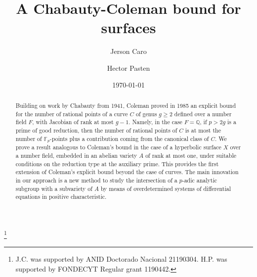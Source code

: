 \documentclass[11pt]{amsart}
\theoremstyle{remark}
\numberwithin{equation}{section}
\begin{document}
\title{A Chabauty-Coleman bound for surfaces}



\author{Jerson Caro}
\address{ Departamento de Matem\'aticas,
Pontificia Universidad Cat\'olica de Chile.
Facultad de Matem\'aticas,
4860 Av.\ Vicu\~na Mackenna,
Macul, RM, Chile}
%


\author{Hector Pasten}
\address{ Departamento de Matem\'aticas,
Pontificia Universidad Cat\'olica de Chile.
Facultad de Matem\'aticas,
4860 Av.\ Vicu\~na Mackenna,
Macul, RM, Chile}
%




\thanks{J.C. was supported by ANID Doctorado Nacional 21190304. H.P. was supported by FONDECYT Regular grant 1190442. }

\date{\today}
%






\begin{abstract}  Building on work by Chabauty from 1941, Coleman proved in 1985 an explicit bound for the number of rational points of a curve $C$ of genus $g\ge 2$ defined over a number field $F$, with Jacobian of rank at most $g-1$. Namely, in the case $F=\mathbb{Q}$, if $p>2g$ is a prime of good reduction, then the number of rational points of $C$ is at most the number of $\mathbb{F}_p$-points plus a contribution coming from the canonical class of $C$.  We prove a result analogous to Coleman's bound in the case of a hyperbolic surface $X$ over a number field, embedded in an abelian variety $A$ of rank at most one, under suitable conditions on the reduction type at the auxiliary prime. This provides the first extension of Coleman's explicit bound beyond the case of curves. The main innovation in our approach is a new method to study the intersection of a $p$-adic analytic subgroup with a subvariety of $A$ by means of overdetermined systems of differential equations in positive characteristic. 
\end{abstract}
\end{document}
